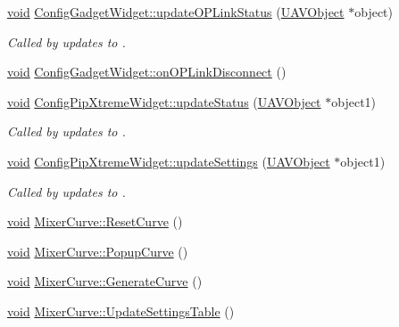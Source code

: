 \begin{DoxyCompactItemize}
\item 
\hyperlink{group___u_a_v_objects_plugin_ga444cf2ff3f0ecbe028adce838d373f5c}{void} \hyperlink{group___config_plugin_ga818055c405858506c9ae07240e0bfad7}{\-Config\-Gadget\-Widget\-::update\-O\-P\-Link\-Status} (\hyperlink{class_u_a_v_object}{\-U\-A\-V\-Object} $\ast$object)
\begin{DoxyCompactList}\small\item\em \-Called by updates to . \end{DoxyCompactList}\item 
\hyperlink{group___u_a_v_objects_plugin_ga444cf2ff3f0ecbe028adce838d373f5c}{void} \hyperlink{group___config_plugin_gaec8bc8bcd267141edd1fee6ca08c3a97}{\-Config\-Gadget\-Widget\-::on\-O\-P\-Link\-Disconnect} ()
\item 
\hyperlink{group___u_a_v_objects_plugin_ga444cf2ff3f0ecbe028adce838d373f5c}{void} \hyperlink{group___config_plugin_gabc0f7192a99a705a14adb140f5ede521}{\-Config\-Pip\-Xtreme\-Widget\-::update\-Status} (\hyperlink{class_u_a_v_object}{\-U\-A\-V\-Object} $\ast$object1)
\begin{DoxyCompactList}\small\item\em \-Called by updates to . \end{DoxyCompactList}\item 
\hyperlink{group___u_a_v_objects_plugin_ga444cf2ff3f0ecbe028adce838d373f5c}{void} \hyperlink{group___config_plugin_gabf6dbd1961284c12d242657add38d28c}{\-Config\-Pip\-Xtreme\-Widget\-::update\-Settings} (\hyperlink{class_u_a_v_object}{\-U\-A\-V\-Object} $\ast$object1)
\begin{DoxyCompactList}\small\item\em \-Called by updates to . \end{DoxyCompactList}\item 
\hyperlink{group___u_a_v_objects_plugin_ga444cf2ff3f0ecbe028adce838d373f5c}{void} \hyperlink{group___config_plugin_ga73b9d64b4c71bd3de1266b66707f8e3a}{\-Mixer\-Curve\-::\-Reset\-Curve} ()
\item 
\hyperlink{group___u_a_v_objects_plugin_ga444cf2ff3f0ecbe028adce838d373f5c}{void} \hyperlink{group___config_plugin_gaec9845f3048d0bb15ba6b31f4659888f}{\-Mixer\-Curve\-::\-Popup\-Curve} ()
\item 
\hyperlink{group___u_a_v_objects_plugin_ga444cf2ff3f0ecbe028adce838d373f5c}{void} \hyperlink{group___config_plugin_gad1f7dbb9fdd65436b5886e20fa930d27}{\-Mixer\-Curve\-::\-Generate\-Curve} ()
\item 
\hyperlink{group___u_a_v_objects_plugin_ga444cf2ff3f0ecbe028adce838d373f5c}{void} \hyperlink{group___config_plugin_gad4cb5385cbf5e389acf3fd394601df07}{\-Mixer\-Curve\-::\-Update\-Settings\-Table} ()

\end{DoxyCompactItemize}
